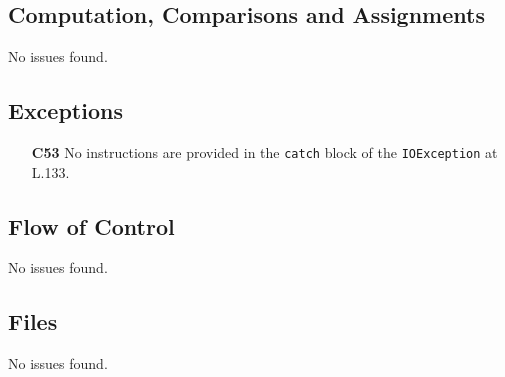 \subsection{Computation, Comparisons and Assignments}
No issues found.

\subsection{Exceptions}
	\begin{itemize}
		\item[\textbf{C53}] No instructions are provided in the \texttt{catch} block of the \texttt{IOException} at L.133.
	\end{itemize}

\subsection{Flow of Control}
No issues found.

\subsection{Files}
No issues found.
